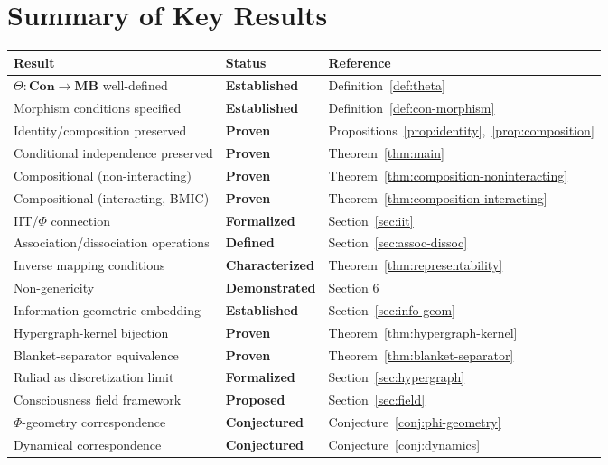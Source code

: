 \documentclass[11pt,a4paper]{article}
\theoremstyle{definition}
\theoremstyle{plain}
\theoremstyle{remark}
\newcommand{\Con}{\mathbf{Con}}
\newcommand{\MB}{\mathbf{MB}}
\begin{document}
\section{Summary of Key Results}

\begin{center}
\begin{tabular}{llp{5cm}}
\toprule
\textbf{Result} & \textbf{Status} & \textbf{Reference} \\
\midrule
$\Theta: \Con \to \MB$ well-defined & \textbf{Established} & Definition~\ref{def:theta} \\
Morphism conditions specified & \textbf{Established} & Definition~\ref{def:con-morphism} \\
Identity/composition preserved & \textbf{Proven} & Propositions~\ref{prop:identity},~\ref{prop:composition} \\
Conditional independence preserved & \textbf{Proven} & Theorem~\ref{thm:main} \\
Compositional (non-interacting) & \textbf{Proven} & Theorem~\ref{thm:composition-noninteracting} \\
Compositional (interacting, BMIC) & \textbf{Proven} & Theorem~\ref{thm:composition-interacting} \\
IIT/$\Phi$ connection & \textbf{Formalized} & Section~\ref{sec:iit} \\
Association/dissociation operations & \textbf{Defined} & Section~\ref{sec:assoc-dissoc} \\
Inverse mapping conditions & \textbf{Characterized} & Theorem~\ref{thm:representability} \\
Non-genericity & \textbf{Demonstrated} & Section 6 \\
Information-geometric embedding & \textbf{Established} & Section~\ref{sec:info-geom} \\
Hypergraph-kernel bijection & \textbf{Proven} & Theorem~\ref{thm:hypergraph-kernel} \\
Blanket-separator equivalence & \textbf{Proven} & Theorem~\ref{thm:blanket-separator} \\
Ruliad as discretization limit & \textbf{Formalized} & Section~\ref{sec:hypergraph} \\
Consciousness field framework & \textbf{Proposed} & Section~\ref{sec:field} \\
$\Phi$-geometry correspondence & \textbf{Conjectured} & Conjecture~\ref{conj:phi-geometry} \\
Dynamical correspondence & \textbf{Conjectured} & Conjecture~\ref{conj:dynamics} \\
\bottomrule
\end{tabular}
\end{center}
\end{document}
